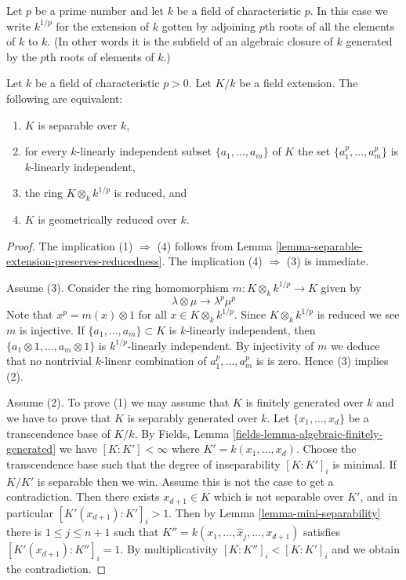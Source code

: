 \noindent
Let $p$ be a prime number and let $k$ be a field of characteristic $p$.
In this case we write $k^{1/p}$ for the extension of $k$ gotten by
adjoining $p$th roots of all the elements of $k$ to $k$.
(In other words it is the subfield of an algebraic closure of
$k$ generated by the $p$th roots of elements of $k$.)

\begin{lemma}
\label{lemma-characterize-separable-field-extensions}
Let $k$ be a field of characteristic $p > 0$.
Let $K/k$ be a field extension.
The following are equivalent:
\begin{enumerate}
\item $K$ is separable over $k$,
\item for every $k$-linearly independent subset $\{a_1, \ldots, a_m\}$
of $K$ the set $\{a^p_1, \ldots, a_m^p\}$ is $k$-linearly independent,
\item the ring $K \otimes_k k^{1/p}$ is reduced, and
\item $K$ is geometrically reduced over $k$.
\end{enumerate}
\end{lemma}

\begin{proof}
The implication (1) $\Rightarrow$ (4) follows from
Lemma \ref{lemma-separable-extension-preserves-reducedness}.
The implication (4) $\Rightarrow$ (3) is immediate.

\medskip\noindent
Assume (3). Consider the ring homomorphism
$m : K \otimes_k k^{1/p} \rightarrow K$ given by 
$$
\lambda \otimes \mu \rightarrow \lambda^p \mu^p
$$
Note that $x^p = m(x) \otimes 1$ for all $x \in K \otimes_k k^{1/p}$.
Since $K \otimes_k k^{1/p}$ is reduced
we see $m$ is injective. If $\{a_1, \ldots, a_m\} \subset K$
is $k$-linearly independent, then $\{a_1 \otimes 1, \ldots, a_m \otimes 1\}$
is $k^{1/p}$-linearly independent. By injectivity of $m$ we deduce
that no nontrivial $k$-linear combination of $a_1^p, \ldots, a_m^p$ is
is zero. Hence (3) implies (2).

\medskip\noindent
Assume (2). To prove (1) we may assume that $K$ is finitely generated over $k$
and we have to prove that $K$ is separably generated over $k$.
Let $\{x_1, \ldots, x_d\}$ be a transcendence base of $K/k$. By
Fields, Lemma \ref{fields-lemma-algebraic-finitely-generated}
we have $[K : K'] < \infty$ where $K' = k(x_1, \ldots, x_d)$.
Choose the transcendence base such that the degree of inseparability
$[K : K']_i$ is minimal. If $K / K'$ is separable then we win.
Assume this is not the case to get a contradiction. Then there exists
$x_{d + 1} \in K$ which is not separable over $K'$, and in particular
$[K'(x_{d+1}) : K']_i > 1$. Then by
Lemma \ref{lemma-mini-separability} there is $1 \leq j \leq n + 1$
such that $K'' = k(x_1, \ldots, \widehat{x}_j, \ldots, x_{d+1})$
satisfies $[K'(x_{d+1}) : K'']_i = 1$. By multiplicativity
$[K : K'']_i < [K : K']_i$ and we obtain the contradiction.
\end{proof}

